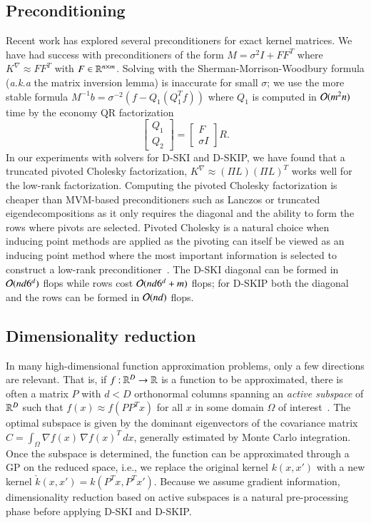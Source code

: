 \subsection{Preconditioning}

Recent work \citep{cutajar2016preconditioning} has explored several 
preconditioners for exact kernel matrices. We have had success with
preconditioners of the form $M = \sigma^2 I + FF^T$ where $K^\nabla \approx
FF^T$ with $F \in \mathbb{R}^{n \times m}$. Solving with the Sherman-Morrison-Woodbury
formula ({\em a.k.a} the matrix inversion lemma) is inaccurate for small
$\sigma$; we use the more stable formula $M^{-1} b = \sigma^{-2} (f-Q_1 (Q_1^T
f))$ where $Q_1$ is computed in $\mathcal{O}(m^2n)$ time by the economy QR
factorization
\begin{equation}\label{eqn:qrsmw}
  \begin{bmatrix} Q_1 \\ Q_2 \end{bmatrix} =
  \begin{bmatrix} F \\ \sigma I \end{bmatrix} R.
\end{equation}
In our experiments with solvers for D-SKI and D-SKIP, we have found that a
truncated pivoted Cholesky factorization, $K^{\nabla} \approx (\Pi L)(\Pi L)^T$
works well for the low-rank factorization. Computing the pivoted Cholesky
factorization is cheaper than MVM-based preconditioners such as Lanczos or
truncated eigendecompositions as it only requires the diagonal and the ability
to form the rows where pivots are selected. Pivoted Cholesky is a natural choice
when inducing point methods are applied as the pivoting can itself be viewed as
an inducing point method where the most important information is selected to
construct a low-rank preconditioner~\cite{harbrecht2012low}. The D-SKI diagonal
can be formed in $\mathcal{O}(nd6^d)$ flops while rows cost $\mathcal{O}(nd6^d + m)$ flops;
for D-SKIP both the diagonal and the rows can be formed in $\mathcal{O}(nd)$ flops.

\subsection{Dimensionality reduction}

In many high-dimensional function approximation problems, only a few directions
are relevant.  That is, if $f \mathbin{:} \mathbb{R}^D \to \mathbb{R}$ is a function to be
approximated, there is often a matrix $P$ with $d < D$ orthonormal columns
spanning an {\em active subspace} of $\mathbb{R}^D$ such that $f(x) \approx f(PP^T x)$
for all $x$ in some domain $\Omega$ of interest~\citep{constantine2015active}. 
The optimal subspace is given by the dominant eigenvectors of the covariance
matrix $C = \int_\Omega \nabla f(x) \, \nabla f(x)^T \, dx$, generally estimated
by Monte Carlo integration. Once the subspace is determined, the function can be
approximated through a GP on the reduced space, i.e., we replace the original
kernel $k(x,x')$ with a new kernel $\check k(x,x') = k(P^T x,P^T x')$.
Because we assume gradient information, dimensionality reduction based on active
subspaces is a natural pre-processing phase before applying D-SKI and D-SKIP.